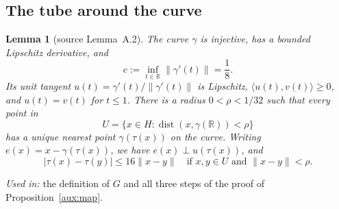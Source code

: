 \documentclass[11pt]{article}
\newcommand{\R}{\mathbb R}
\newcommand{\norm}[1]{\lVert #1\rVert}
\newcommand{\ip}[2]{\langle #1,#2\rangle}
\DeclareMathOperator{\dist}{dist}
\newtheorem{lemma}[theorem]{Lemma}
\theoremstyle{definition}
\numberwithin{equation}{section}
\begin{document}
\subsection{The tube around the curve}

\begin{lemma}[source Lemma~A.2]\label{aux:tube}
The curve \(\gamma\) is injective, has a bounded Lipschitz derivative, and
\[
 c:=\inf_{t\in\R}\norm{\gamma'(t)}=\frac18.
\]
Its unit tangent \(u(t)=\gamma'(t)/\norm{\gamma'(t)}\) is Lipschitz,
\(\ip{u(t)}{v(t)}\ge0\), and \(u(t)=v(t)\) for \(t\le1\).
There is a radius \(0<\rho<1/32\) such that every point in
\[
 U=\{x\in H:\dist(x,\gamma(\R))<\rho\}
\]
has a unique nearest point \(\gamma(\tau(x))\) on the curve. Writing
\(e(x)=x-\gamma(\tau(x))\), we have \(e(x)\perp u(\tau(x))\), and
\begin{equation}\label{aux:parameter}
 |\tau(x)-\tau(y)|\le16\norm{x-y}
 \quad\text{if }x,y\in U\text{ and }\norm{x-y}<\rho.
\end{equation}
\end{lemma}
\noindent\emph{Used in:} the definition of \(G\) and all three steps of
the proof of Proposition~\ref{aux:map}.
\end{document}
